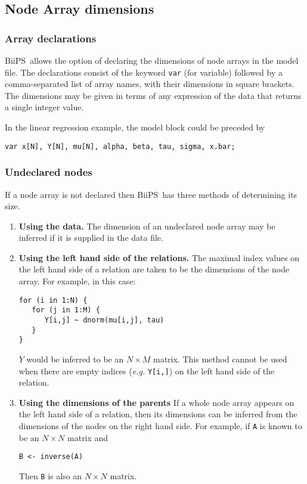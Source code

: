 \documentclass[11pt, a4paper, titlepage]{report}
\newcommand{\biips}{\textsf{BiiPS}}
\begin{document}
\subsection{Node Array dimensions}

\subsubsection*{Array declarations}

\biips\ allows the option of declaring the dimensions of node arrays in
the model file. The declarations consist of the keyword \texttt{var}
(for variable) followed by a comma-separated list of array names, with
their dimensions in square brackets. The dimensions may be given in
terms of any expression of the data that returns a single integer
value.

In the linear regression example, the model block could be preceded by
\begin{verbatim}
var x[N], Y[N], mu[N], alpha, beta, tau, sigma, x.bar;
\end{verbatim}

\subsubsection*{Undeclared nodes}

If a node array is not declared then \biips\ has three methods of
determining its size.
\begin{enumerate}
\item {\bf Using the data.}  The dimension of an undeclared node array
  may be inferred if it is supplied in the data file.
\item {\bf Using the left hand side of the relations.}  The maximal
  index values on the left hand side of a relation are taken to be the
  dimensions of the node array.  For example, in this case:
\begin{verbatim}
for (i in 1:N) {
   for (j in 1:M) {
      Y[i,j] ~ dnorm(mu[i,j], tau)
   }
}
\end{verbatim}
$Y$ would be inferred to be an $N \times M$ matrix. This method cannot 
be used when there are empty indices ({\em e.g.} \verb+Y[i,]+) on the left
hand side of the relation.
\item {\bf Using the dimensions of the parents} If a whole node array
  appears on the left hand side of a relation, then its dimensions can
  be inferred from the dimensions of the nodes on the right hand side.
  For example, if \verb+A+ is known to be an $N \times N$ matrix
  and
\begin{verbatim}
B <- inverse(A)
\end{verbatim}
Then \verb+B+ is also an $N \times N$ matrix.
\end{enumerate}
\end{document}
